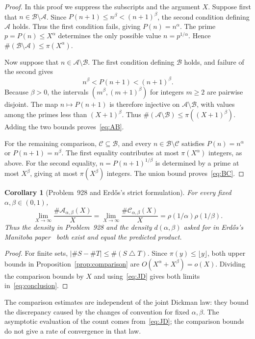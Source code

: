 \documentclass[11pt,a4paper]{amsart}
\newtheorem{corollary}[proposition]{Corollary}
\newcommand{\A}{\mathcal A}
\newcommand{\B}{\mathcal B}
\newcommand{\C}{\mathcal C}
\begin{document}
\begin{proof}
In this proof we suppress the subscripts and the argument $X$.
Suppose first that $n\in\B\setminus\A$. Since
$P(n+1)\le n^\beta<(n+1)^\beta$, the second condition defining $\A$
holds. Thus the first condition fails, giving $P(n)=n^\alpha$.
The prime $p=P(n)\le X^\alpha$ determines the only possible value
$n=p^{1/\alpha}$. Hence $\#(\B\setminus\A)\le\pi(X^\alpha)$.

Now suppose that $n\in\A\setminus\B$. The first condition defining
$\B$ holds, and failure of the second gives
\[
 n^\beta<P(n+1)<(n+1)^\beta.
\]
Because $\beta>0$, the intervals $(m^\beta,(m+1)^\beta)$ for integers
$m\ge2$ are pairwise disjoint. The map $n\mapsto P(n+1)$ is therefore
injective on $\A\setminus\B$, with values among the primes less than
$(X+1)^\beta$. Thus $\#(\A\setminus\B)\le\pi((X+1)^\beta)$.
Adding the two bounds proves~\eqref{eq:AB}.

For the remaining comparison, $\C\subseteq\B$, and every
$n\in\B\setminus\C$ satisfies
$P(n)=n^\alpha$ or $P(n+1)=n^\beta$. The first equality contributes at
most $\pi(X^\alpha)$ integers, as above. For the second equality,
$n=P(n+1)^{1/\beta}$ is determined by a prime at most $X^\beta$,
giving at most $\pi(X^\beta)$ integers. The union bound
proves~\eqref{eq:BC}.
\end{proof}

\begin{corollary}[Problem~928 and Erd\H{o}s's strict formulation]\label{cor:density}
For every fixed $\alpha,\beta\in(0,1)$,
\begin{equation}\label{eq:conclusion}
 \lim_{X\to\infty}\frac{\#\A_{\alpha,\beta}(X)}X
 =\lim_{X\to\infty}\frac{\#\C_{\alpha,\beta}(X)}X
 =\rho(1/\alpha)\rho(1/\beta).
\end{equation}
Thus the density in Problem~928 and the density $d(\alpha,\beta)$
asked for in Erd\H{o}s's Manitoba paper~\cite[p.~25]{Erdos1976Manitoba}
both exist and equal the predicted product.
\end{corollary}

\begin{proof}
For finite sets, $|\#S-\#T|\le\#(S\mathbin\triangle T)$. Since
$\pi(y)\le\lfloor y\rfloor$, both upper bounds in
Proposition~\ref{prop:comparison} are $O(X^\alpha+X^\beta)=o(X)$.
Dividing the comparison bounds by $X$ and using~\eqref{eq:JD} gives
both limits in~\eqref{eq:conclusion}.
\end{proof}

The comparison estimates are independent of the joint Dickman law:
they bound the discrepancy caused by the changes of convention for
fixed $\alpha,\beta$. The asymptotic evaluation of the count comes
from~\eqref{eq:JD}; the comparison bounds do not give a rate of
convergence in that law.
\end{document}
